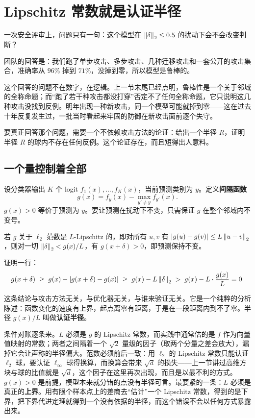 \section{\texorpdfstring{Lipschitz 常数就是认证半径}{Lipschitz 常数就是认证半径}}
\label{sec:17-Constrained-Guarantees/02-Adversarial-Robustness/02}

一次安全评审上，问题只有一句：这个模型在 \(\left\lVert\delta\right\rVert_2\le0.5\) 的扰动下会不会改变判断？

团队的回答是：我们跑了单步攻击、多步攻击、几种迁移攻击和一套公开的攻击集合，准确率从 \(96\%\) 掉到 \(71\%\)，没掉到零，所以模型是鲁棒的。

这个回答的问题不在数字，在逻辑。上一节末尾已经点明，鲁棒性是一个关于邻域的全称命题；而``跑了若干种攻击都没打穿''否定不了任何全称命题，它只说明这几种攻击没找到反例。明年出现一种新攻击，同一个模型可能就掉到零——这在过去十年反复发生过，一批当时看起来牢固的防御在新攻击面前逐个失守。

要真正回答那个问题，需要一个不依赖攻击方法的论证：给出一个半径 \(R\)，证明半径 \(R\) 的球内不存在任何反例。这个论证存在，而且短得出人意料。

\subsection{一个量控制着全部}

设分类器输出 \(K\) 个 logit \(f_1(x),\dots,f_K(x)\)，当前预测类别为 \(y\)。定义\textbf{间隔函数}
\[
g(x)=f_y(x)-\max_{y'\neq y}f_{y'}(x).
\]
\(g(x)>0\) 等价于预测为 \(y\)。要让预测在扰动下不变，只需保证 \(g\) 在整个邻域内不变号。

\begin{theorem}[Lipschitz 认证]
若 \(g\) 关于 \(\ell_2\) 范数是 \(L\)-Lipschitz 的，即对所有 \(u,v\) 有 \(\left|g(u)-g(v)\right|\le L\left\lVert u-v\right\rVert_2\)，则对一切 \(\left\lVert\delta\right\rVert_2<g(x)/L\)，有 \(g(x+\delta)>0\)，即预测保持不变。
\end{theorem}

证明一行：
\[
g(x+\delta)\;\ge\;g(x)-\left|g(x+\delta)-g(x)\right|\;\ge\;g(x)-L\left\lVert\delta\right\rVert_2\;>\;g(x)-L\cdot\frac{g(x)}{L}=0 .
\]

这条结论与攻击方法无关，与优化器无关，与谁来验证无关。它是一个纯粹的分析陈述：函数变化的速度有上界，起点离零有距离，于是在一段距离内到不了零。半径 \(g(x)/L\) 叫做\textbf{认证半径}。

条件对账逐条来。\(L\) 必须是 \(g\) 的 Lipschitz 常数，而实践中通常估的是 \(f\) 作为向量值映射的常数；两者之间隔着一个 \(\sqrt2\) 量级的因子（取两个分量之差会放大），漏掉它会让声称的半径偏大。范数必须前后一致：用 \(\ell_2\) 的 Lipschitz 常数只能认证 \(\ell_2\) 球，要认证 \(\ell_\infty\) 球得换算，而换算会带来 \(\sqrt d\) 的损失——上一节讲过高维方块与球的比值就是 \(\sqrt d\)，这个因子在这里再次出现，而且是以最不利的方式。\(g(x)>0\) 是前提，模型本来就分错的点没有半径可言。最要紧的一条：\(L\) 必须是真正的\textbf{上界}。用有限个样本点上的差商去``估计''一个 Lipschitz 常数，得到的是下界，把下界代进定理就得到一个没有依据的半径，而这个错误不会以任何方式暴露出来。

